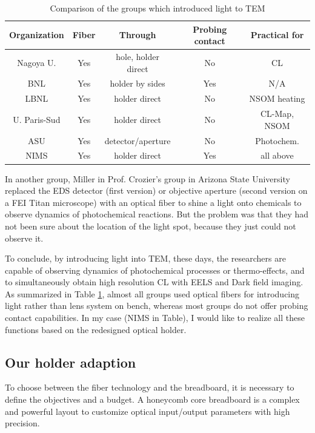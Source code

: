 \begin{table}[ht]
\centering 
\begin{tabular}{|c|c|c|c|c|} 
\hline 
Organization & Fiber & Through & Probing contact & Practical for\\ [0.5ex] 
\hline 
Nagoya U. & Yes & hole, holder direct & No & CL\\[1.5ex] 
BNL & Yes & holder by sides & Yes & N/A\\[1.5ex]
LBNL & Yes& holder direct & No & NSOM heating\\[1.5ex]
U. Paris-Sud & Yes & holder direct & No & CL-Map, NSOM\\[1.5ex]
ASU & Yes & detector/aperture & No & Photochem.\\[1.5ex]
NIMS & Yes & holder direct & Yes & all above\\
\hline
\end{tabular}
\caption{Comparison of the groups which introduced light to TEM} 
\label{table2.2} 
\end{table}

In another group, Miller in Prof. Crozier's group in Arizona State University replaced the EDS detector (first version) or objective aperture (second version on a FEI Titan microscope) with an optical fiber to shine a light onto chemicals to observe dynamics of photochemical reactions.\cite{Miller2012} 
But the problem was that they had not been sure about the location of the light spot, because they just could not observe it.

To conclude, by introducing light into TEM, these days, the researchers are capable of observing dynamics of photochemical processes or thermo-effects, and to simultaneously obtain high resolution CL with EELS and Dark field imaging. As summarized in Table \ref{table2.2}, almost all groups used optical fibers for introducing light rather than lens system on bench, whereas most groups do not offer probing contact capabilities. In my case (NIMS in Table), I would like to realize all these functions based on the redesigned optical holder. 

\subsection{Our holder adaption}
To choose between the fiber technology and the breadboard, it is necessary to define the objectives and a budget. 
A honeycomb core breadboard is a complex and powerful layout to customize optical input/output parameters with high precision. 

